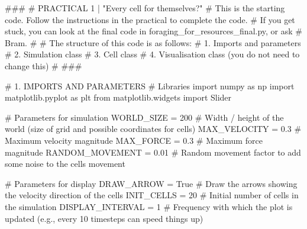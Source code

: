 \documentclass[
  letterpaper,
  DIV=11,
  numbers=noendperiod]{scrreprt}
\newenvironment{Shaded}{\begin{snugshade}}{\end{snugshade}}
\newcommand{\CommentTok}[1]{\textcolor[rgb]{0.37,0.37,0.37}{#1}}
\newcommand{\DecValTok}[1]{\textcolor[rgb]{0.68,0.00,0.00}{#1}}
\newcommand{\FloatTok}[1]{\textcolor[rgb]{0.68,0.00,0.00}{#1}}
\newcommand{\ImportTok}[1]{\textcolor[rgb]{0.00,0.46,0.62}{#1}}
\newcommand{\NormalTok}[1]{\textcolor[rgb]{0.00,0.23,0.31}{#1}}
\newcommand{\OperatorTok}[1]{\textcolor[rgb]{0.37,0.37,0.37}{#1}}
\newcommand{\VariableTok}[1]{\textcolor[rgb]{0.07,0.07,0.07}{#1}}
\theoremstyle{definition}
\theoremstyle{remark}
\begin{document}
\begin{tcolorbox}[enhanced jigsaw, leftrule=.75mm, colbacktitle=quarto-callout-note-color!10!white, coltitle=black, colback=white, left=2mm, bottomtitle=1mm, arc=.35mm, titlerule=0mm, breakable, bottomrule=.15mm, opacitybacktitle=0.6, colframe=quarto-callout-note-color-frame, title=\textcolor{quarto-callout-note-color}{\faInfo}\hspace{0.5em}{STARTING CODE FOR ``moving cells''}, opacityback=0, toprule=.15mm, toptitle=1mm, rightrule=.15mm]

\begin{Shaded}
\begin{Highlighting}[]
\CommentTok{\#\#\#}
\CommentTok{\# PRACTICAL 1 | "Every cell for themselves?"}
\CommentTok{\# This is the starting code. Follow the instructions in the practical to complete the code. }
\CommentTok{\# If you get stuck, you can look at the final code in \textasciigrave{}foraging\_for\_resources\_final.py\textasciigrave{}, or ask}
\CommentTok{\# Bram. }
\CommentTok{\#}
\CommentTok{\# The structure of this code is as follows:}
\CommentTok{\# 1. Imports and parameters}
\CommentTok{\# 2. Simulation class}
\CommentTok{\# 3. Cell class}
\CommentTok{\# 4. Visualisation class (you do not need to change this)}
\CommentTok{\#}
\CommentTok{\#\#\#}

\CommentTok{\# 1. IMPORTS AND PARAMETERS}
\CommentTok{\# Libraries}
\ImportTok{import}\NormalTok{ numpy }\ImportTok{as}\NormalTok{ np}
\ImportTok{import}\NormalTok{ matplotlib.pyplot }\ImportTok{as}\NormalTok{ plt}
\ImportTok{from}\NormalTok{ matplotlib.widgets }\ImportTok{import}\NormalTok{ Slider}

\CommentTok{\# Parameters for simulation}
\NormalTok{WORLD\_SIZE }\OperatorTok{=} \DecValTok{200}    \CommentTok{\# Width / height of the world (size of grid and possible coordinates for cells)}
\NormalTok{MAX\_VELOCITY }\OperatorTok{=} \FloatTok{0.3}  \CommentTok{\# Maximum velocity magnitude}
\NormalTok{MAX\_FORCE }\OperatorTok{=} \FloatTok{0.3}     \CommentTok{\# Maximum force magnitude}
\NormalTok{RANDOM\_MOVEMENT  }\OperatorTok{=} \FloatTok{0.01} \CommentTok{\# Random movement factor to add some noise to the cell\textquotesingle{}s movement}

\CommentTok{\# Parameters for display}
\NormalTok{DRAW\_ARROW }\OperatorTok{=} \VariableTok{True}  \CommentTok{\# Draw the arrows showing the velocity direction of the cells}
\NormalTok{INIT\_CELLS }\OperatorTok{=} \DecValTok{20} \CommentTok{\# Initial number of cells in the simulation}
\NormalTok{DISPLAY\_INTERVAL }\OperatorTok{=} \DecValTok{1} \CommentTok{\# Frequency with which the plot is updated (e.g., every 10 timesteps can speed things up)}


\end{Highlighting}
\end{Shaded}
\end{tcolorbox}
\end{document}
